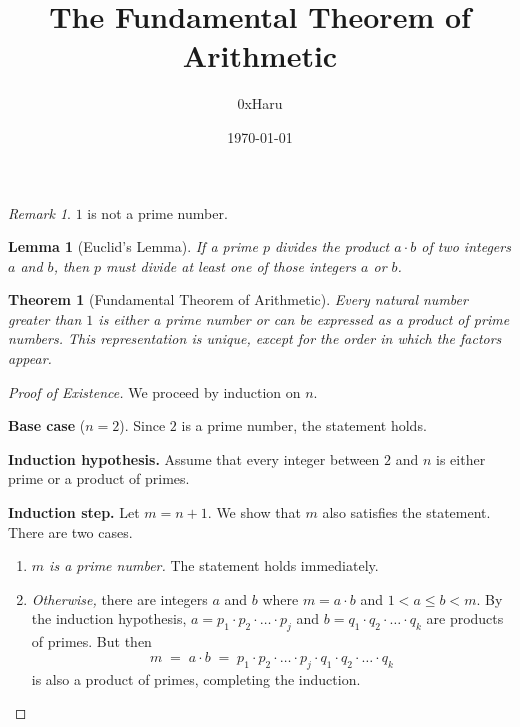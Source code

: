 \documentclass[12pt, a4paper]{article}
\title{\textbf{The Fundamental Theorem of Arithmetic}}
\author{0xHaru}
\date{\today}
\theoremstyle{plain}
\newtheorem{theorem}{Theorem}
\newtheorem{lemma}{Lemma}
\theoremstyle{remark}
\newtheorem{remark}{Remark}
\begin{document}
\maketitle

\begin{remark}
$1$ is not a prime number.
\end{remark}

\vspace{0.5em}

\begin{lemma}[Euclid's Lemma]
If a prime $p$ divides the product $a \cdot b$ of two integers $a$ and $b$, then $p$
must divide at least one of those integers $a$ or $b$.
\end{lemma}

\vspace{0.5em}

\begin{theorem}[Fundamental Theorem of Arithmetic]
Every natural number greater than $1$ is either a prime number or can be
expressed as a product of prime numbers. This representation is unique, except
for the order in which the factors appear.
\end{theorem}

\vspace{0.5em}

\begin{proof}[Proof of Existence]
We proceed by induction on $n$.

\medskip
\textbf{Base case} ($n = 2$).
Since $2$ is a prime number, the statement holds.

\medskip
\textbf{Induction hypothesis.}
Assume that every integer between $2$ and $n$ is either prime or a product of
primes.

\medskip
\textbf{Induction step.}
Let $m = n + 1$. We show that $m$ also satisfies the statement. There are two
cases.

\begin{enumerate}
  \item \emph{$m$ is a prime number.} The statement holds immediately.

  \item \emph{Otherwise,} there are integers $a$ and $b$ where $m = a \cdot b$
        and $1 < a \leq b < m$. By the induction hypothesis,
        $a = p_1 \cdot p_2 \cdot \ldots \cdot p_j$ and $b = q_1 \cdot q_2 \cdot \ldots \cdot q_k$
        are products of primes. But then
        \[
            m \;=\; a \cdot b
              \;=\; p_1 \cdot p_2 \cdot \ldots \cdot p_j \cdot q_1 \cdot q_2 \cdot \ldots \cdot q_k
        \]
        is also a product of primes, completing the induction.
        \qedhere
\end{enumerate}
\end{proof}
\end{document}
